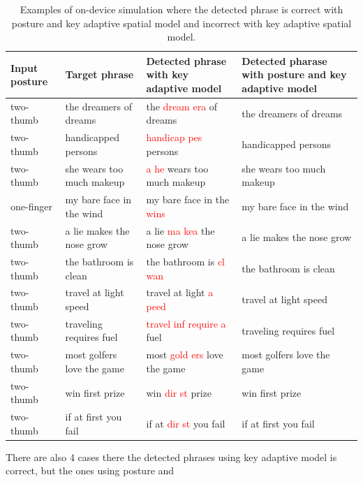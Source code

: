 \documentclass{sigchi}
\newcommand\tabhead[1]{\small\textbf{#1}}
\begin{document}
\begin{table}[tb]
  \centering
  \begin{tabularx}{0.925\textwidth}{|l|l|l|l|}
  \hline
  \tabhead{Input posture} & \tabhead{Target phrase} & \tabhead{Detected phrase with key adaptive model} 
  & \multicolumn{1}{|p{0.526\columnwidth}|}{\tabhead{Detected pharase with posture and key adaptive model}}\\
  \hline
  two-thumb & the dreamers of dreams & the \textcolor{red}{dream era} of dreams & the dreamers of dreams  \\
  \hline
  two-thumb & handicapped persons & \textcolor{red}{handicap pes} persons & handicapped persons \\
  \hline
  two-thumb & she wears too much makeup & \textcolor{red}{a he} wears too much makeup & she wears too much makeup \\
  \hline
  one-finger & my bare face in the wind & my bare face in the \textcolor{red}{wins} & my bare face in the wind \\ 
  \hline
  two-thumb & a lie makes the nose grow & a lie \textcolor{red}{ma kea} the nose grow & a lie makes the nose grow \\
  \hline 
  two-thumb & the bathroom is clean & the bathroom is \textcolor{red}{cl wan} & the bathroom is clean \\
  \hline 
  two-thumb & travel at light speed & travel at light \textcolor{red}{a peed} & travel at light speed \\ 
  \hline
  two-thumb & traveling requires fuel & \textcolor{red}{travel inf require a} fuel & traveling requires fuel \\
  \hline 
  two-thumb & most golfers love the game & most \textcolor{red}{gold ers} love the game & most golfers love the game \\ 
  \hline
  two-thumb & win first prize & win \textcolor{red}{dir st} prize & win first prize \\ 
  \hline
  two-thumb & if at first you fail & if at \textcolor{red}{dir st} you fail & if at first you fail \\ 
  \hline
  \end{tabularx}
  \caption{Examples of on-device simulation where the detected phrase is correct
  with posture and key adaptive spatial model and incorrect with key adaptive spatial
  model.}
  \label{tab:on-device}
\end{table}

There are also 4 cases there the detected phrases using key adaptive model is correct, but the ones
using posture and 
\end{document}
